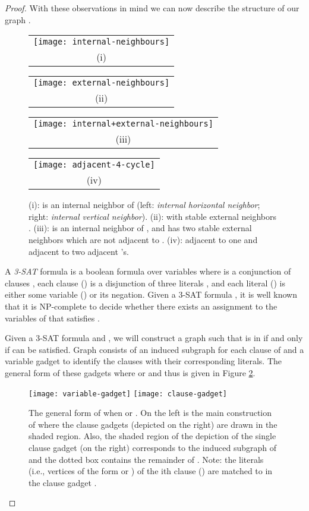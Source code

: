 \documentclass[11pt,3p,times]{elsarticle}
\newenvironment{myproof}{\begin{proof}}{\end{proof}}
\begin{document}
\begin{myproof}
With these observations
in mind we can now describe the structure of our graph .
\begin{figure}[h]
\begin{tabular}{c}
\texttt{[image: internal-neighbours]} \\
(i)
\end{tabular}
\hfill
\begin{tabular}{c}
\texttt{[image: external-neighbours]}\\
(ii)
\end{tabular}
\hfill
\begin{tabular}{c}
\texttt{[image: internal+external-neighbours]}\\
(iii)
\end{tabular}
\hfill
\begin{tabular}{c}
\texttt{[image: adjacent-4-cycle]}\\
(iv)
\end{tabular}
\caption{(i):  is an internal neighbor of  (left:
\emph{internal horizontal  neighbor}; right: \emph{internal
vertical neighbor}). (ii):  with stable external neighbors
. (iii):  is an internal neighbor of , and
 has two stable external neighbors  which are not adjacent
to . (iv):  adjacent to one  and  adjacent to two
adjacent 's.} \label{fig:internal-external}
\end{figure}
A \emph{3-SAT} formula  is a boolean formula over variables
 where  is a conjunction of  clauses
, each clause  () is a
disjunction of three literals ,
and each literal  () is either
some variable  ()
or its negation.
Given a 3-SAT formula , it is well known that it is
NP-complete to decide whether there exists an assignment to the
variables of  that satisfies  \cite{Kar1972}.

Given a 3-SAT formula  and ,
we will construct a graph 
such that  is in  if and only if  can be
satisfied. Graph  consists of an induced subgraph  for
each clause  of  and a variable gadget to identify the
clauses with their corresponding literals. The general form of
these gadgets where  or  and thus
 is given in Figure \ref{fig:gadgets}.
\begin{figure}[h]
\centering
\hfill
\texttt{[image: variable-gadget]}
\hfill
\texttt{[image: clause-gadget]}
\hfill \ 
\caption{The general form of  when  or
. On the left is the main construction of  where the clause gadgets (depicted on the right) are drawn in the shaded region. Also, the shaded region of the depiction of the single clause gadget (on the right) corresponds to the induced subgraph  of  and the dotted box contains the remainder of . Note: the literals (i.e., vertices of the form  or
) of the ith clause () are matched to  in the clause gadget
.} \label{fig:gadgets}
\end{figure}



\end{myproof}
\end{document}
